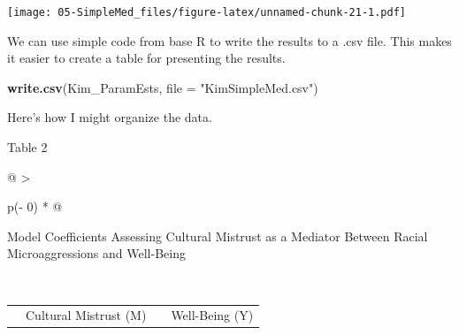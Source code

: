 \documentclass[
  11pt,
]{book}
\newenvironment{Shaded}{\begin{snugshade}}{\end{snugshade}}
\newcommand{\AttributeTok}[1]{\textcolor[rgb]{0.27,0.27,0.27}{#1}}
\newcommand{\FunctionTok}[1]{\textcolor[rgb]{0.27,0.27,0.27}{\textbf{#1}}}
\newcommand{\NormalTok}[1]{#1}
\newcommand{\StringTok}[1]{\textcolor[rgb]{0.5,0.5,0.5}{#1}}
\begin{document}
\texttt{[image: 05-SimpleMed\_files/figure-latex/unnamed-chunk-21-1.pdf]}

We can use simple code from base R to write the results to a .csv file. This makes it easier to create a table for presenting the results.

\begin{Shaded}
\begin{Highlighting}[]
\FunctionTok{write.csv}\NormalTok{(Kim\_ParamEsts, }\AttributeTok{file =} \StringTok{"KimSimpleMed.csv"}\NormalTok{)}
\end{Highlighting}
\end{Shaded}

Here's how I might organize the data.

Table 2

\begin{longtable}[]{@{}
  >{\raggedright\arraybackslash}p{(\columnwidth - 0\tabcolsep) * }@{}}
\toprule\noalign{}
\begin{minipage}[b]{\linewidth}\raggedright
Model Coefficients Assessing Cultural Mistrust as a Mediator Between Racial Microaggressions and Well-Being
\end{minipage} \\
\midrule\noalign{}
\endhead
\bottomrule\noalign{}
\endlastfoot
\end{longtable}

\begin{longtable}[]{@{}
  >{\raggedright\arraybackslash}p{}
  >{\centering\arraybackslash}p{}
  >{\centering\arraybackslash}p{}
  >{\centering\arraybackslash}p{}@{}}
\toprule\noalign{}
\endhead
\bottomrule\noalign{}
\endlastfoot
& Cultural Mistrust (M) & & Well-Being (Y) \\
\end{longtable}
\end{document}
